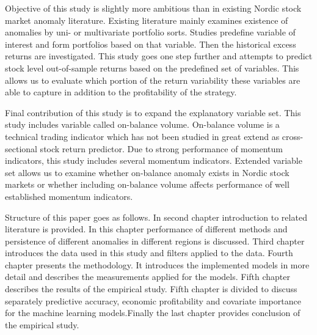 \documentclass{article}
\begin{document}
Objective of this study is slightly more ambitious than in existing Nordic stock market anomaly literature. Existing literature mainly examines existence of anomalies by uni- or multivariate portfolio sorts. Studies predefine variable of interest and form portfolios based on that variable. Then the historical excess returns are investigated. This study goes one step further and attempts to predict stock level out-of-sample returns based on the predefined set of variables. This allows us to evaluate which portion of the return variability these variables are able to capture in addition to the profitability of the strategy. \par

Final contribution of this study is to expand the explanatory variable set. This study includes variable called on-balance volume. On-balance volume is a technical trading indicator which has not been studied in great extend as cross-sectional stock return predictor. Due to strong performance of momentum indicators, this study includes several momentum indicators. Extended variable set allows us to examine whether on-balance anomaly exists in Nordic stock markets or whether including on-balance volume affects performance of well established momentum indicators. \par


Structure of this paper goes as follows. In second chapter introduction to related literature is provided. In this chapter performance of different methods and persistence of different anomalies in different regions is discussed. Third chapter introduces the data used in this study and filters applied to the data. Fourth chapter presents the methodology. It introduces the implemented models in more detail and describes the measurements applied for the models. Fifth chapter describes the results of the empirical study. Fifth chapter is divided to discuss separately predictive accuracy, economic profitability and covariate importance for the machine learning models.Finally the last chapter provides conclusion of the empirical study. \par

\end{document}
